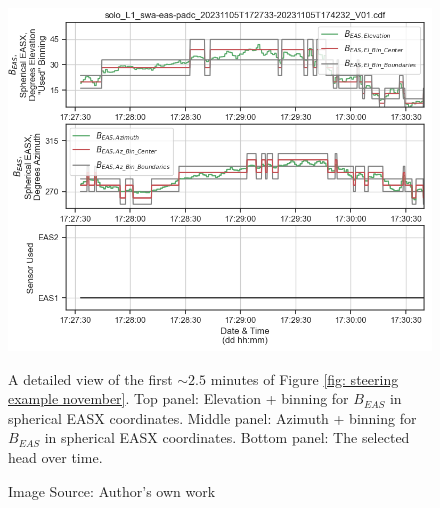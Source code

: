 \begin{figure}[h!]
    \centering
    \centerfloat
    \includegraphics[width=1.05\linewidth]{figures/Steering Example Detail Start.png}
    \caption{A detailed view of the first \(\sim2.5\) minutes of Figure \ref{fig: steering example november}. Top panel: Elevation + binning for \(B_{EAS}\) in spherical EASX coordinates. Middle panel: Azimuth + binning for \(B_{EAS}\) in spherical EASX coordinates. Bottom panel: The selected head over time.}
    \caption*{Image Source: Author's own work}
    \label{fig: steering example november detail}
\end{figure}

